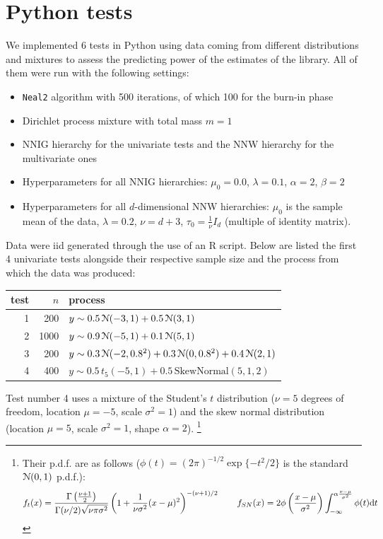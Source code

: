\section{Python tests}\label{chap-py-test}
We implemented 6 tests in Python using data coming from different distributions and mixtures to assess the predicting power of the estimates of the library.
All of them were run with the following settings:
\begin{itemize}
	\item \verb|Neal2| algorithm with 500 iterations, of which 100 for the burn-in phase
	\item Dirichlet process mixture with total mass $m=1$
	\item NNIG hierarchy for the univariate tests and the NNW hierarchy for the multivariate ones
	\item Hyperparameters for all NNIG hierarchies: $\mu_0 = 0.0$, $\lambda = 0.1$, $\alpha = 2$, $\beta = 2$
	\item Hyperparameters for all $d$-dimensional NNW hierarchies: $\mu_0$ is the sample mean of the data, $\lambda = 0.2$, $\nu = d + 3$, $\tau_0 = \frac{1}{\nu} I_d$ (multiple of identity matrix).
\end{itemize}
Data were iid generated through the use of an R script.
Below are listed the first 4 univariate tests alongside their respective sample size and the process from which the data was produced:
\begin{center}
	\begin{tabular}{r|r|l}
		test & $n$ & process \\ \hline
		1 &  200 & $y \sim 0.5 \, \mathcal N(-3, 1) + 0.5 \, \mathcal N(3, 1)$ \\
		2 & 1000 & $y \sim 0.9 \, \mathcal N(-5, 1) + 0.1 \, \mathcal N(5, 1)$ \\
		3 &  200 & $y \sim 0.3 \, \mathcal N(-2, 0.8^2) + 0.3 \, \mathcal N(0, 0.8^2) + 0.4 \, \mathcal N(2, 1)$ \\
		4 &  400 & $y \sim 0.5 \, t_5(-5, 1 ) + 0.5 \, \text{SkewNormal}(5, 1, 2)$
	\end{tabular}
\end{center}
Test number 4 uses a mixture of the Student's $t$ distribution ($\nu=5$ degrees of freedom, location $\mu=-5$, scale $\sigma^2 = 1$) and the skew normal distribution (location $\mu=5$, scale $\sigma^2=1$, shape $\alpha=2$). \footnote{Their p.d.f. are as follows ($\phi(t) = (2\pi)^{-1/2} \exp\{-t^2/2\}$ is the standard $\mathcal N(0,1)$ p.d.f.):
$$ f_t(x) = \frac{\Gamma\left(\frac{\nu+1}{2}\right)}{\Gamma(\nu/2) \sqrt{\nu \pi \sigma^2}} \left( 
1+\frac{1}{\nu \sigma^2}(x-\mu)^2 \right)^{-(\nu+1)/2} \qquad
f_{SN}(x) = 2 \phi\left(\frac{x-\mu}{\sigma^2}\right) \int_{-\infty}^{\alpha \frac{x-\mu}{\sigma^2}} \phi(t) \mathrm d t
$$}
